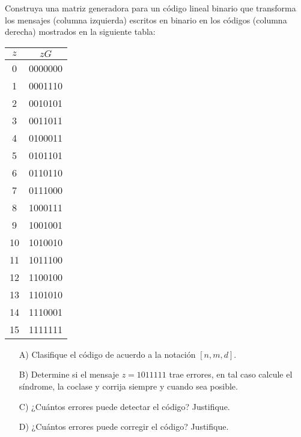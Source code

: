
Construya una matriz generadora para un código lineal binario que transforma los mensajes (columna izquierda) escritos en binario en los códigos (columna derecha) mostrados en la siguiente tabla:

\begin{center}
\begin{tabular}{c|c}
$z$ & $zG$ \\
\hline
0 & 0000000 \\
1 & 0001110 \\
2 & 0010101 \\
3 & 0011011 \\
4 & 0100011 \\
5 & 0101101 \\
6 & 0110110 \\
7 & 0111000 \\
8 & 1000111 \\
9 & 1001001 \\
10 & 1010010 \\
11 & 1011100 \\
12 & 1100100 \\
13 & 1101010 \\
14 & 1110001 \\
15 & 1111111 \\
\end{tabular}
\end{center}

\begin{itemize}
    \item[A)] Clasifique el código de acuerdo a la notación $[n,m,d]$.
    \item[B)] Determine si el mensaje $z= 1011111$ trae errores, en tal caso calcule el síndrome, la coclase y corrija siempre y cuando sea posible.
    \item[C)]¿Cuántos errores puede detectar el código? Justifique.
    \item[D)]¿Cuántos errores puede corregir el código? Justifique.
\end{itemize}